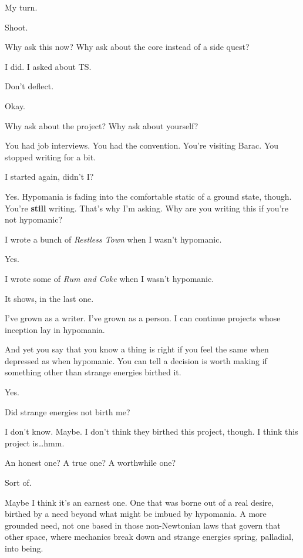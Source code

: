 My turn.

\begin{ally}
Shoot.
\end{ally}
Why ask this now? Why ask about the core instead of a side quest?

\begin{ally}
I did. I asked about TS.
\end{ally}
Don't deflect.

\begin{ally}
Okay.
\end{ally}
Why ask about the project? Why ask about yourself?

\begin{ally}
You had job interviews. You had the convention. You're visiting Barac. You stopped writing for a bit.
\end{ally}
I started again, didn't I?

\begin{ally}
Yes. Hypomania is fading into the comfortable static of a ground state, though. You're \textbf{still} writing. That's why I'm asking. Why are you writing this if you're not hypomanic?
\end{ally}
I wrote a bunch of \emph{Restless Town} when I wasn't hypomanic.

\begin{ally}
Yes.
\end{ally}
I wrote some of \emph{Rum and Coke} when I wasn't hypomanic.

\begin{ally}
It shows, in the last one.
\end{ally}
I've grown as a writer. I've grown as a person. I can continue projects whose inception lay in hypomania.

\begin{ally}
And yet you say that you know a thing is right if you feel the same when depressed as when hypomanic. You can tell a decision is worth making if something other than strange energies birthed it.
\end{ally}
Yes.

\begin{ally}
Did strange energies not birth me?
\end{ally}
I don't know. Maybe. I don't think they birthed this project, though. I think this project is\ldots{}hmm.

\begin{ally}
An honest one? A true one? A worthwhile one?
\end{ally}
Sort of.

Maybe I think it's an earnest one. One that was borne out of a real desire, birthed by a need beyond what might be imbued by hypomania. A more grounded need, not one based in those non-Newtonian laws that govern that other space, where mechanics break down and strange energies spring, palladial, into being.
